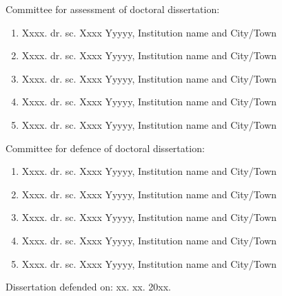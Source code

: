 \documentclass[12pt,twoside,onecolumn]{book}
\begin{document}
\begin{titlepage}
\begin{flushleft}
        \newpage
        \textnormal{}
        \vskip 30mm
        Committee for assessment of doctoral dissertation:
        \begin{enumerate}
        \item Xxxx. dr. sc. Xxxx Yyyyy, Institution name and City/Town
        \item Xxxx. dr. sc. Xxxx Yyyyy, Institution name and City/Town
        \item Xxxx. dr. sc. Xxxx Yyyyy, Institution name and City/Town
        \item Xxxx. dr. sc. Xxxx Yyyyy, Institution name and City/Town
        \item Xxxx. dr. sc. Xxxx Yyyyy, Institution name and City/Town
        \end{enumerate}
        
        \vskip 15mm
        Committee for defence of doctoral dissertation:
        \begin{enumerate}
        \item Xxxx. dr. sc. Xxxx Yyyyy, Institution name and City/Town
        \item Xxxx. dr. sc. Xxxx Yyyyy, Institution name and City/Town
        \item Xxxx. dr. sc. Xxxx Yyyyy, Institution name and City/Town
        \item Xxxx. dr. sc. Xxxx Yyyyy, Institution name and City/Town
        \item Xxxx. dr. sc. Xxxx Yyyyy, Institution name and City/Town
        \end{enumerate}
        \vskip 15mm
        Dissertation defended on: xx. xx. 20xx.
    \end{flushleft}
    
    
    
    
    
    
\end{titlepage}

\tableofcontents
\setcounter{tocdepth}{2}
\setcounter{secnumdepth}{2}

\clearpage
{}
\setlength\cftbeforetabskip{10pt}
\begin{spacing}{1}
\listoftables
{}
\end{spacing}

\clearpage
{}
\begin{spacing}{1}
\setlength\cftbeforefigskip{10pt}
\listoffigures
{}
\end{spacing}
\end{document}
